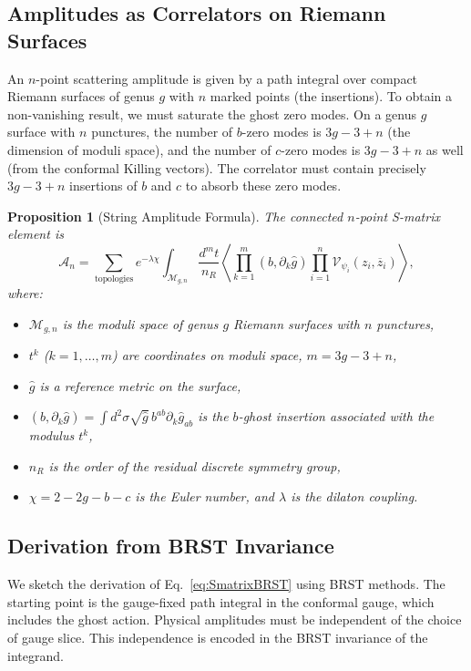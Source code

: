 \documentclass[11pt]{article}
\newtheorem{proposition}{Proposition}
\renewcommand{\bar}{\overline}
\begin{document}
\subsection{Amplitudes as Correlators on Riemann Surfaces}

An $n$-point scattering amplitude is given by a path integral over compact Riemann surfaces of genus $g$ with $n$ marked points (the insertions). To obtain a non-vanishing result, we must saturate the ghost zero modes. On a genus $g$ surface with $n$ punctures, the number of $b$-zero modes is $3g-3+n$ (the dimension of moduli space), and the number of $c$-zero modes is $3g-3+n$ as well (from the conformal Killing vectors). The correlator must contain precisely $3g-3+n$ insertions of $b$ and $c$ to absorb these zero modes.

\begin{proposition}[String Amplitude Formula]
The connected $n$-point S-matrix element is
\begin{equation}
\mathcal{A}_n = \sum_{\text{topologies}} e^{-\lambda \chi} \int_{\mathcal{M}_{g,n}} \frac{d^{m}t}{n_R} \left\langle \prod_{k=1}^{m} (b, \partial_k \hat{g}) \prod_{i=1}^{n} \mathcal{V}_{\psi_i}(z_i, \bar{z}_i) \right\rangle,
\label{eq:SmatrixBRST}
\end{equation}
where:
\begin{itemize}
\item $\mathcal{M}_{g,n}$ is the moduli space of genus $g$ Riemann surfaces with $n$ punctures,
\item $t^k$ ($k=1,\dots,m$) are coordinates on moduli space, $m = 3g-3+n$,
\item $\hat{g}$ is a reference metric on the surface,
\item $(b, \partial_k \hat{g}) = \int d^2\sigma \sqrt{\hat{g}} \, b^{ab} \partial_k \hat{g}_{ab}$ is the $b$-ghost insertion associated with the modulus $t^k$,
\item $n_R$ is the order of the residual discrete symmetry group,
\item $\chi = 2-2g-b-c$ is the Euler number, and $\lambda$ is the dilaton coupling.
\end{itemize}
\end{proposition}

\subsection{Derivation from BRST Invariance}

We sketch the derivation of Eq.~\eqref{eq:SmatrixBRST} using BRST methods. The starting point is the gauge-fixed path integral in the conformal gauge, which includes the ghost action. Physical amplitudes must be independent of the choice of gauge slice. This independence is encoded in the BRST invariance of the integrand.
\end{document}
